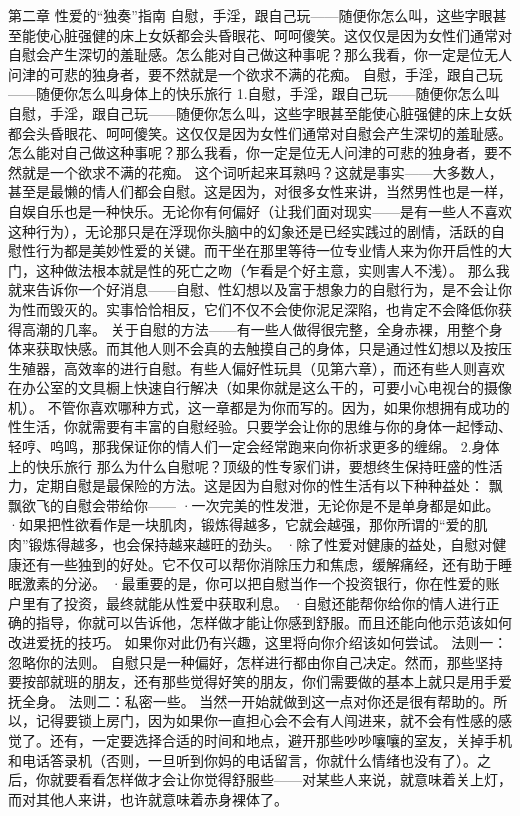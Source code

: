 \documentclass[12pt,UTF8]{ctexbook}
\begin{document}
第二章 性爱的“独奏”指南
自慰，手淫，跟自己玩——随便你怎么叫，这些字眼甚至能使心脏强健的床上女妖都会头昏眼花、呵呵傻笑。这仅仅是因为女性们通常对自慰会产生深切的羞耻感。怎么能对自己做这种事呢？那么我看，你一定是位无人问津的可悲的独身者，要不然就是一个欲求不满的花痴。
自慰，手淫，跟自己玩——随便你怎么叫身体上的快乐旅行
1.自慰，手淫，跟自己玩——随便你怎么叫
自慰，手淫，跟自己玩——随便你怎么叫，这些字眼甚至能使心脏强健的床上女妖都会头昏眼花、呵呵傻笑。这仅仅是因为女性们通常对自慰会产生深切的羞耻感。怎么能对自己做这种事呢？那么我看，你一定是位无人问津的可悲的独身者，要不然就是一个欲求不满的花痴。
这个词听起来耳熟吗？这就是事实——大多数人，甚至是最懒的情人们都会自慰。这是因为，对很多女性来讲，当然男性也是一样，自娱自乐也是一种快乐。无论你有何偏好（让我们面对现实——是有一些人不喜欢这种行为），无论那只是在浮现你头脑中的幻象还是已经实践过的剧情，活跃的自慰性行为都是美妙性爱的关键。而干坐在那里等待一位专业情人来为你开启性的大门，这种做法根本就是性的死亡之吻（乍看是个好主意，实则害人不浅）。
那么我就来告诉你一个好消息——自慰、性幻想以及富于想象力的自慰行为，是不会让你为性而毁灭的。实事恰恰相反，它们不仅不会使你泥足深陷，也肯定不会降低你获得高潮的几率。
关于自慰的方法——有一些人做得很完整，全身赤裸，用整个身体来获取快感。而其他人则不会真的去触摸自己的身体，只是通过性幻想以及按压生殖器，高效率的进行自慰。有些人偏好性玩具（见第六章），而还有些人则喜欢在办公室的文具橱上快速自行解决（如果你就是这么干的，可要小心电视台的摄像机）。
不管你喜欢哪种方式，这一章都是为你而写的。因为，如果你想拥有成功的性生活，你就需要有丰富的自慰经验。只要学会让你的思维与你的身体一起悸动、轻哼、呜鸣，那我保证你的情人们一定会经常跑来向你祈求更多的缠绵。
2.身体上的快乐旅行
那么为什么自慰呢？顶级的性专家们讲，要想终生保持旺盛的性活力，定期自慰是最保险的方法。这是因为自慰对你的性生活有以下种种益处：
飘飘欲飞的自慰会带给你——
·一次完美的性发泄，无论你是不是单身都是如此。
·如果把性欲看作是一块肌肉，锻炼得越多，它就会越强，那你所谓的“爱的肌肉”锻炼得越多，也会保持越来越旺的劲头。
·除了性爱对健康的益处，自慰对健康还有一些独到的好处。它不仅可以帮你消除压力和焦虑，缓解痛经，还有助于睡眠激素的分泌。
·最重要的是，你可以把自慰当作一个投资银行，你在性爱的账户里有了投资，最终就能从性爱中获取利息。
·自慰还能帮你给你的情人进行正确的指导，你就可以告诉他，怎样做才能让你感到舒服。而且还能向他示范该如何改进爱抚的技巧。
如果你对此仍有兴趣，这里将向你介绍该如何尝试。
法则一：忽略你的法则。
自慰只是一种偏好，怎样进行都由你自己决定。然而，那些坚持要按部就班的朋友，还有那些觉得好笑的朋友，你们需要做的基本上就只是用手爱抚全身。
法则二：私密一些。
当然一开始就做到这一点对你还是很有帮助的。所以，记得要锁上房门，因为如果你一直担心会不会有人闯进来，就不会有性感的感觉了。还有，一定要选择合适的时间和地点，避开那些吵吵嚷嚷的室友，关掉手机和电话答录机（否则，一旦听到你妈的电话留言，你就什么情绪也没有了）。之后，你就要看看怎样做才会让你觉得舒服些——对某些人来说，就意味着关上灯，而对其他人来讲，也许就意味着赤身裸体了。
\end{document}
